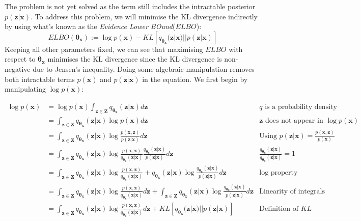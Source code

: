                 The problem is not yet solved as the term still includes the intractable posterior $p(\bm{z}|\bm{x})$. To address this problem, we will minimise the KL divergence indirectly by using what's known as the \textit{Evidence Lower BOund}($ELBO$):
                    \[ ELBO(\bm{\theta_x}) := \log p(\bm{x}) - KL\left[q_{\bm{\theta_x}}(\bm{z}|\bm{x}) || p(\bm{z}|\bm{x})\right] \]
                Keeping all other parameters fixed, we can see that maximising $ELBO$ with respect to $\bm{\theta_x}$ minimises the KL divergence since the KL divergence is non-negative due to Jensen's inequality\citep{jensen1906fonctions}. Doing some algebraic manipulation removes both intractable terms $p(\bm{x})$ and $p(\bm{z}|\bm{x})$ in the equation. We first begin by manipulating $\log p(\bm{x})$:
                
                \begin{align*}
                  \log p(\bm{x}) &= \log p(\bm{x}) \int_{\bm{z} \in \bm{Z}} q_{\bm{\theta_x}}(\bm{z}|\bm{x}) d\bm{z} & \text{$q$ is a probability density function}\\
                    &= \int_{\bm{z} \in \bm{Z}} q_{\bm{\theta_x}}(\bm{z}|\bm{x}) \log p(\bm{x}) d\bm{z} & \text{$\bm{z}$ does not appear in $\log p(\bm{x})$}\\
                    &= \int_{\bm{z} \in \bm{Z}} q_{\bm{\theta_x}}(\bm{z}|\bm{x}) \log \frac{p(\bm{x}, \bm{z})}{p(\bm{z} | \bm{x})} d\bm{z} & \text{Using $p(\bm{z} | \bm{x}) = \frac{p(\bm{x}, \bm{z})}{p(\bm{x})}$}\\
                    &= \int_{\bm{z} \in \bm{Z}} q_{\bm{\theta_x}}(\bm{z}|\bm{x}) \log \frac{p(\bm{x}, \bm{z})}{q_{\bm{\theta_x}}(\bm{z}|\bm{x})}\frac{q_{\bm{\theta_x}}(\bm{z}|\bm{x})}{p(\bm{z} | \bm{x})} d\bm{z} & \frac{q_{\bm{\theta_x}}(\bm{z}|\bm{x})}{q_{\bm{\theta_x}}(\bm{z}|\bm{x})} = 1\\
                    &= \int_{\bm{z} \in \bm{Z}} q_{\bm{\theta_x}}(\bm{z}|\bm{x}) \log \frac{p(\bm{x}, \bm{z})}{q_{\bm{\theta_x}}(\bm{z}|\bm{x})} + q_{\bm{\theta_x}}(\bm{z}|\bm{x}) \log \frac{q_{\bm{\theta_x}}(\bm{z}|\bm{x})}{p(\bm{z} | \bm{x})} d\bm{z} & \text{$\log$ property}\\
                    &= \int_{\bm{z} \in \bm{Z}} q_{\bm{\theta_x}}(\bm{z}|\bm{x}) \log \frac{p(\bm{x}, \bm{z})}{q_{\bm{\theta_x}}(\bm{z}|\bm{x})} d\bm{z} + \int_{\bm{z} \in \bm{Z}} q_{\bm{\theta_x}}(\bm{z}|\bm{x}) \log \frac{q_{\bm{\theta_x}}(\bm{z}|\bm{x})}{p(\bm{z} | \bm{x})} d\bm{z} & \text{Linearity of integrals}\\
                    &= \int_{\bm{z} \in \bm{Z}} q_{\bm{\theta_x}}(\bm{z}|\bm{x}) \log \frac{p(\bm{x}, \bm{z})}{q_{\bm{\theta_x}}(\bm{z}|\bm{x})}d\bm{z} + KL\left[q_{\bm{\theta_x}}(\bm{z}|\bm{x}) || p(\bm{z}|\bm{x})\right] & \text{Definition of $KL$}\\
                \end{align*}
                
